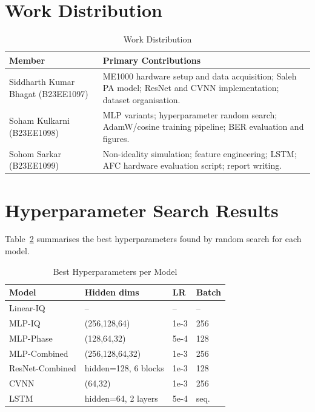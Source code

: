 \documentclass[journal]{IEEEtran}
\begin{document}
\section{Work Distribution}
\label{sec:workdist}

\begin{table}[!h]
  \centering
  \caption{Work Distribution}
  \label{tab:workdist}
  \small
  \begin{tabular}{p{2.1cm}p{5.5cm}}
    \toprule
    Member & Primary Contributions \\
    \midrule
    Siddharth Kumar Bhagat (B23EE1097)
      & ME1000 hardware setup and data acquisition; Saleh PA model;
        ResNet and CVNN implementation; dataset organisation. \\[2pt]
    Soham Kulkarni (B23EE1098)
      & MLP variants; hyperparameter random search; AdamW/cosine
        training pipeline; BER evaluation and figures. \\[2pt]
    Sohom Sarkar (B23EE1099)
      & Non-ideality simulation; feature engineering; LSTM; AFC
        hardware evaluation script; report writing. \\
    \bottomrule
  \end{tabular}
\end{table}

\appendix
\section{Hyperparameter Search Results}
\label{app:hp}

Table~\ref{tab:hp} summarises the best hyperparameters found by random search for
each model.

\begin{table}[!t]
  \centering
  \caption{Best Hyperparameters per Model}
  \label{tab:hp}
  \small
  \begin{tabular}{llll}
    \toprule
    Model & Hidden dims & LR & Batch \\
    \midrule
    Linear-IQ       & --               & --     & -- \\
    MLP-IQ          & (256,128,64)     & 1e-3   & 256 \\
    MLP-Phase       & (128,64,32)      & 5e-4   & 128 \\
    MLP-Combined    & (256,128,64,32)  & 1e-3   & 256 \\
    ResNet-Combined & hidden=128, 6 blocks & 1e-3 & 128 \\
    CVNN            & (64,32)          & 1e-3   & 256 \\
    LSTM            & hidden=64, 2 layers & 5e-4 & seq. \\
    \bottomrule
  \end{tabular}
\end{table}
\end{document}
